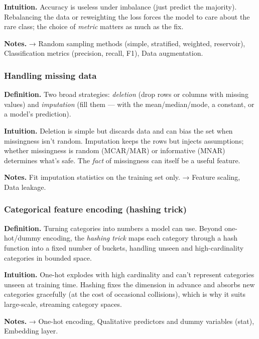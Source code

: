 \documentclass[
  10pt,
  letterpaper,
  onecolumn]{article}
\begin{document}
\textbf{Intuition.} Accuracy is useless under imbalance (just predict
the majority). Rebalancing the data or reweighting the loss forces the
model to care about the rare class; the choice of \emph{metric} matters
as much as the fix.

\textbf{Notes.} → Random sampling methods (simple, stratified, weighted,
reservoir), Classification metrics (precision, recall, F1), Data
augmentation.

\hypertarget{handling-missing-data}{%
\subsubsection{Handling missing data}\label{handling-missing-data}}

\textbf{Definition.} Two broad strategies: \emph{deletion} (drop rows or
columns with missing values) and \emph{imputation} (fill them --- with
the mean/median/mode, a constant, or a model's prediction).

\textbf{Intuition.} Deletion is simple but discards data and can bias
the set when missingness isn't random. Imputation keeps the rows but
injects assumptions; whether missingness is random (MCAR/MAR) or
informative (MNAR) determines what's safe. The \emph{fact} of
missingness can itself be a useful feature.

\textbf{Notes.} Fit imputation statistics on the training set only. →
Feature scaling, Data leakage.

\hypertarget{categorical-feature-encoding-hashing-trick}{%
\subsubsection{Categorical feature encoding (hashing
trick)}\label{categorical-feature-encoding-hashing-trick}}

\textbf{Definition.} Turning categories into numbers a model can use.
Beyond one-hot/dummy encoding, the \emph{hashing trick} maps each
category through a hash function into a fixed number of buckets,
handling unseen and high-cardinality categories in bounded space.

\textbf{Intuition.} One-hot explodes with high cardinality and can't
represent categories unseen at training time. Hashing fixes the
dimension in advance and absorbs new categories gracefully (at the cost
of occasional collisions), which is why it suits large-scale, streaming
category spaces.

\textbf{Notes.} → One-hot encoding, Qualitative predictors and dummy
variables (stat), Embedding layer.
\end{document}

